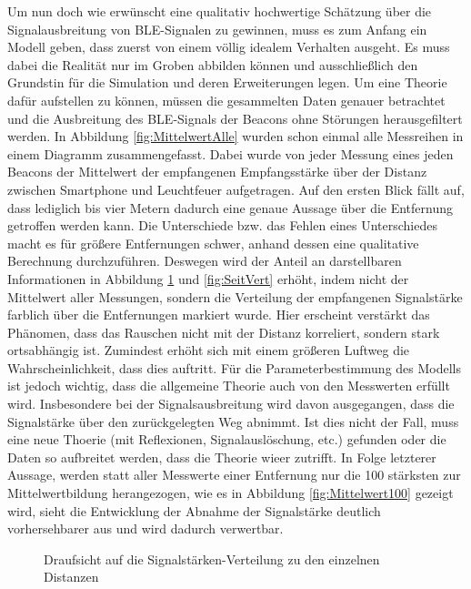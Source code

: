 Um nun doch wie erwünscht eine qualitativ hochwertige Schätzung über die Signalausbreitung von BLE-Signalen zu gewinnen, muss es zum Anfang ein Modell geben, dass zuerst von einem völlig idealem Verhalten ausgeht. Es muss dabei die Realität nur im Groben abbilden können und ausschließlich den Grundstin für die Simulation und deren Erweiterungen legen. Um eine Theorie dafür aufstellen zu können, müssen die gesammelten Daten genauer betrachtet und die Ausbreitung des BLE-Signals der Beacons ohne Störungen herausgefiltert werden. In Abbildung \ref{fig:MittelwertAlle} wurden schon einmal alle Messreihen in einem Diagramm zusammengefasst. Dabei wurde von jeder Messung eines jeden Beacons der Mittelwert der empfangenen Empfangsstärke über der Distanz zwischen Smartphone und Leuchtfeuer aufgetragen. Auf den ersten Blick fällt auf, dass lediglich bis vier Metern dadurch eine genaue Aussage über die Entfernung getroffen werden kann. Die Unterschiede bzw. das Fehlen eines Unterschiedes macht es für größere Entfernungen schwer, anhand dessen eine qualitative Berechnung durchzuführen. Deswegen wird der Anteil an darstellbaren Informationen in Abbildung \ref{fig:DraufVert} und \ref{fig:SeitVert} erhöht, indem nicht der Mittelwert aller Messungen, sondern die Verteilung der empfangenen Signalstärke farblich über die Entfernungen markiert wurde. Hier erscheint verstärkt das Phänomen, dass das Rauschen nicht mit der Distanz korreliert, sondern stark ortsabhängig ist. Zumindest erhöht sich mit einem größeren Luftweg die Wahrscheinlichkeit, dass dies auftritt. Für die Parameterbestimmung des Modells ist jedoch wichtig, dass die allgemeine Theorie auch von den Messwerten erfüllt wird. Insbesondere bei der Signalsausbreitung wird davon ausgegangen, dass die Signalstärke über den zurückgelegten Weg abnimmt. Ist dies nicht der Fall, muss eine neue Thoerie (mit Reflexionen, Signalauslöschung, etc.) gefunden oder die Daten so aufbreitet werden, dass die Theorie wieer zutrifft. In Folge letzterer Aussage, werden statt aller Messwerte einer Entfernung nur die 100 stärksten zur Mittelwertbildung herangezogen, wie es in Abbildung \ref{fig:Mittelwert100} gezeigt wird, sieht die Entwicklung der Abnahme der Signalstärke deutlich vorhersehbarer aus und wird dadurch verwertbar. 
\begin{figure}[H] 
\centering
{}
\caption{Draufsicht auf die Signalstärken-Verteilung zu den einzelnen Distanzen}
\label{fig:DraufVert}
\end{figure}
